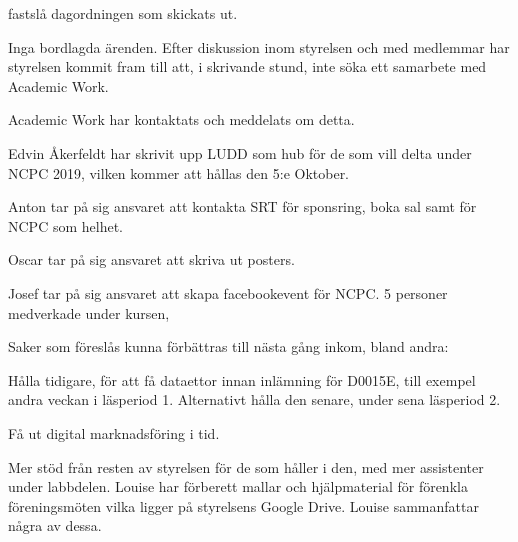 \documentclass{protokoll}
\date{2019-09-24}  %
\begin{document}
\newpage  


\begin{beslut}
     \att fastslå dagordningen som skickats ut.
\end{beslut}

Inga bordlagda ärenden.
Efter diskussion inom styrelsen och med medlemmar har styrelsen kommit fram
till att, i skrivande stund, inte söka ett samarbete med Academic Work. 


Academic Work har kontaktats och meddelats om detta.

Edvin Åkerfeldt har skrivit upp LUDD som hub för de som vill delta under NCPC 
2019, vilken kommer att hållas den 5:e Oktober. 


Anton tar på sig ansvaret att kontakta SRT för sponsring, boka sal samt för 
NCPC som helhet.


Oscar tar på sig ansvaret att skriva ut posters. 

Josef tar på sig ansvaret att skapa facebookevent för NCPC.
5 personer medverkade under kursen, 

Saker som föreslås kunna förbättras till nästa gång inkom, bland andra: 


Hålla tidigare, för att få dataettor innan inlämning för D0015E, till exempel 
andra veckan i läsperiod 1. Alternativt hålla den senare, under sena läsperiod
2.  


Få ut digital marknadsföring i tid. 


Mer stöd från resten av styrelsen för de som håller i den, med mer assistenter
under labbdelen. 
Louise har förberett mallar och hjälpmaterial för förenkla föreningsmöten vilka 
ligger på styrelsens Google Drive. 
Louise sammanfattar några av dessa. 
\end{document}
